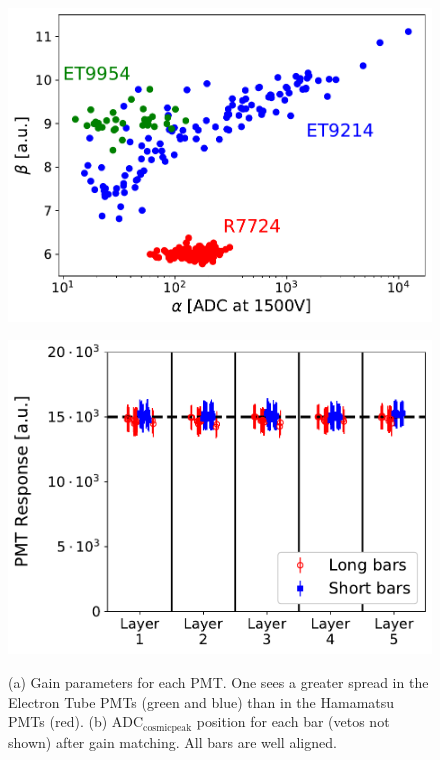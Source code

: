 \documentclass[3p,final,twocolumn]{elsarticle}
\begin{document}
\begin{figure}[th]
	\centering
		\begin{minipage}{0.46\textwidth}
			\includegraphics[width=\textwidth]{gainspread.pdf}
			\subcaption{}
			\label{fig:gain}
		\end{minipage}
		\begin{minipage}{0.46\textwidth}
			\includegraphics[width=\textwidth]{gainsadcresponse.pdf}
			\subcaption{}
		\label{fig:hv_settings}
		\end{minipage}
		\caption{ (a) Gain parameters for each PMT. One sees a greater spread in the Electron Tube PMTs (green and blue) than in the Hamamatsu PMTs (red). (b) $\mathrm{ADC}_{\mathrm{cosmic peak}}$ position for each bar (vetos not shown) after gain matching. All bars are well aligned.}
\end{figure}
\end{document}
